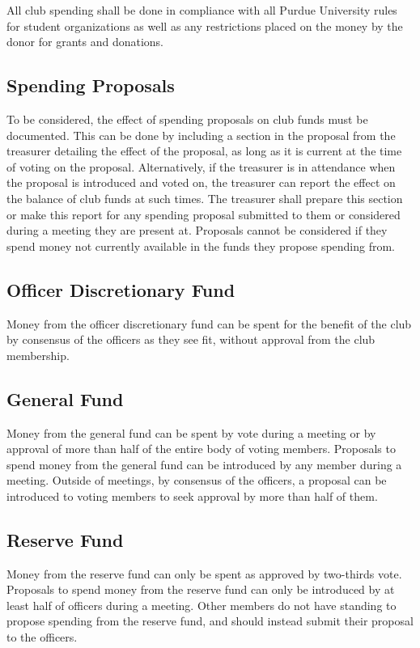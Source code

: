 \documentclass{article}
\begin{document}
All club spending shall be done in compliance with all Purdue University rules
for student organizations as well as any restrictions placed on the money by the
donor for grants and donations.

\subsection{Spending Proposals}

To be considered, the effect of spending proposals on club funds must be
documented. This can be done by including a section in the proposal from the
treasurer detailing the effect of the proposal, as long as it is current at the
time of voting on the proposal. Alternatively, if the treasurer is in attendance
when the proposal is introduced and voted on, the treasurer can report the
effect on the balance of club funds at such times. The treasurer shall prepare
this section or make this report for any spending proposal submitted to them or
considered during a meeting they are present at. Proposals cannot be considered
if they spend money not currently available in the funds they propose spending
from.

\subsection{Officer Discretionary Fund}

Money from the officer discretionary fund can be spent for the benefit of the
club by consensus of the officers as they see fit, without approval from the
club membership.

\subsection{General Fund}

Money from the general fund can be spent by vote during a meeting or by approval
of more than half of the entire body of voting members. Proposals to spend money
from the general fund can be introduced by any member during a meeting. Outside
of meetings, by consensus of the officers, a proposal can be introduced to
voting members to seek approval by more than half of them.

\subsection{Reserve Fund}

Money from the reserve fund can only be spent as approved by two-thirds vote.
Proposals to spend money from the reserve fund can only be introduced by at
least half of officers during a meeting. Other members do not have standing to
propose spending from the reserve fund, and should instead submit their proposal
to the officers.
\end{document}
